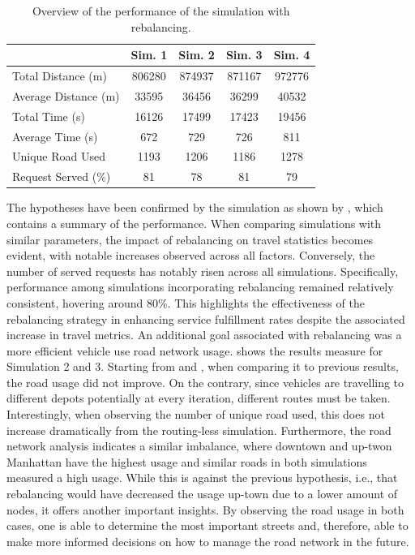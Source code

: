 \begin{table}[h]
	\centering
	\begin{tabular}{ |p{3.7cm}|c|c|c|c|}
		\hline
		& Sim. 1 & Sim. 2 & Sim. 3 & Sim. 4  \\
		\hline
		Total Distance (m)    &806280&   874937 & 871167 &  972776 \\
		Average Distance (m)  &33595 & 36456  &36299  & 40532 \\
		Total Time (s)         &16126&17499   &  17423& 19456 \\
		Average Time (s)      & 672&  729  & 726 &  811\\
		Unique Road Used 				&1193&1206&1186&1278 \\
		Request Served  (\%)&81 &  78 &  81& 79 \\
	\end{tabular}
	
	\caption{Overview of the performance of the simulation with rebalancing. }
	\label{tab:rebalancing_simulation}   
\end{table}
The hypotheses have been confirmed by the simulation as shown by , which contains a summary of the performance. When comparing simulations with similar parameters, the impact of rebalancing on travel statistics becomes evident, with notable increases observed across all factors. Conversely, the number of served requests has notably risen across all simulations. Specifically, performance among simulations incorporating rebalancing remained relatively consistent, hovering around 80\%. This highlights the effectiveness of the rebalancing strategy in enhancing service fulfillment rates despite the associated increase in travel metrics. An additional goal associated with rebalancing was a more efficient vehicle use road network usage.  shows the results measure for Simulation 2 and 3. Starting from  and , when comparing it to previous results, the road usage did not improve. On the contrary, since vehicles are travelling to different depots potentially at every iteration, different routes must be taken. Interestingly, when observing the number of unique road used, this does not increase dramatically from the routing-less simulation. Furthermore, the road network analysis indicates a similar imbalance, where downtown and up-twon Manhattan have the highest usage and similar roads in both simulations measured a high usage. While this is against the previous hypothesis, i.e., that rebalancing would have decreased the usage up-town due to a lower amount of nodes, it offers another important insights. By observing the road usage in both cases, one is able to determine the most important streets and, therefore, able to make more informed decisions on how to manage the road network in the future. \\
